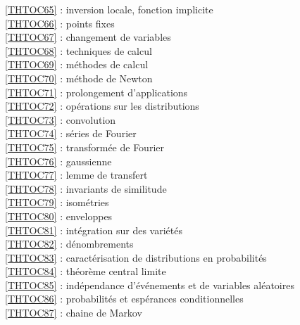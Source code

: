 \ref {THTOC65} : inversion locale, fonction implicite\\
\ref {THTOC66} : points fixes\\
\ref {THTOC67} : changement de variables\\
\ref {THTOC68} : techniques de calcul\\
\ref {THTOC69} : méthodes de calcul\\
\ref {THTOC70} : méthode de Newton\\
\ref {THTOC71} : prolongement d'applications\\
\ref {THTOC72} : opérations sur les distributions\\
\ref {THTOC73} : convolution\\
\ref {THTOC74} : séries de Fourier\\
\ref {THTOC75} : transformée de Fourier\\
\ref {THTOC76} : gaussienne\\
\ref {THTOC77} : lemme de transfert\\
\ref {THTOC78} : invariants de similitude\\
\ref {THTOC79} : isométries\\
\ref {THTOC80} : enveloppes\\
\ref {THTOC81} : intégration sur des variétés\\
\ref {THTOC82} : dénombrements\\
\ref {THTOC83} : caractérisation de distributions en probabilités\\
\ref {THTOC84} : théorème central limite\\
\ref {THTOC85} : indépendance d'événements et de variables aléatoires\\
\ref {THTOC86} : probabilités et espérances conditionnelles\\
\ref {THTOC87} : chaine de Markov\\
